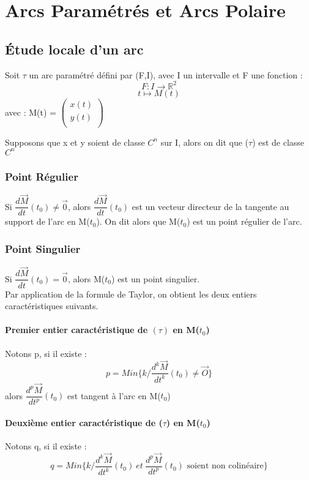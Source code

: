 \chapter{Arcs Paramétrés et Arcs Polaire}
\section{Étude locale d'un arc}
\begin{de}
Soit $\tau$ un arc paramétré défini par (F,I), avec I un intervalle et F une fonction : 
$$F : I \rightarrow \mathbb{R}^2$$
$$t \mapsto M(t)$$
avec : M(t) = $\begin{pmatrix}
  x(t)\\
  y(t)\\
\end{pmatrix}$
\end{de}
\begin{prop}
Supposons que x et y soient de classe $C^n$ sur I, alors on dit que ($\tau$) est de classe $C^n$
\end{prop}
\subsection{Point Régulier} 
Si $\dfrac{d\overrightarrow{M}}{dt}(t_0) \neq \overrightarrow{0}$, alors  $\dfrac{d\overrightarrow{M}}{dt}(t_0)$ est un vecteur directeur de la tangente au support de l'arc en M($t_0$). On dit alors que M($t_0$) est un point régulier de l'arc.
\subsection{Point Singulier} Si $\dfrac{d\overrightarrow{M}}{dt}(t_0) = \overrightarrow{0}$, alors M($t_0$) est un point singulier.\\
Par application de la formule de Taylor, on obtient les deux entiers caractéristiques suivants.
\subsubsection{Premier entier caractéristique de $(\tau)$ en M($t_0$)}
\begin{de}
Notons p, si il existe : 
$$p = Min\{k / \dfrac{d^k\overrightarrow{M}}{dt^k}(t_0) \neq \overrightarrow{O}\}$$
alors $\dfrac{d^p\overrightarrow{M}}{dt^p}(t_0)$ est tangent à l'arc en M($t_0$)
\end{de}
\subsubsection{Deuxième entier caractéristique de ($\tau$) en M($t_0$)}
Notons q, si il existe :
$$q = Min\{k / \dfrac{d^k\overrightarrow{M}}{dt^k}(t_0)~ et~ \dfrac{d^p\overrightarrow{M}}{dt^p}(t_0) \mbox{ soient non colinéaire} \}$$
